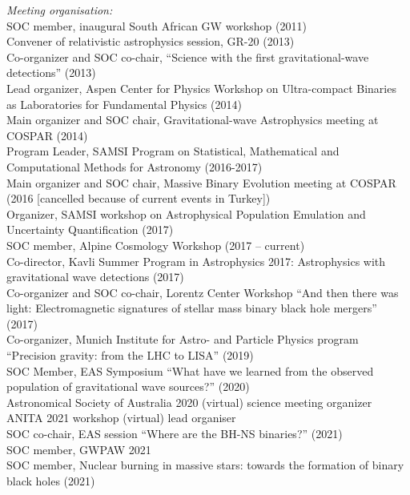 \documentclass[margin,line]{res}
\begin{document}
\begin{resume}
{\it Meeting organisation:}\\
SOC member, inaugural South African GW workshop (2011)\\
Convener of relativistic astrophysics session, GR-20 (2013)\\
Co-organizer and SOC co-chair, ``Science with the first gravitational-wave detections'' (2013)\\
Lead organizer, Aspen Center for Physics Workshop on Ultra-compact Binaries as Laboratories for Fundamental Physics (2014)\\
Main organizer and SOC chair, Gravitational-wave Astrophysics meeting at COSPAR (2014)\\
Program Leader, SAMSI Program on Statistical, Mathematical and Computational Methods for Astronomy (2016-2017)\\
Main organizer and SOC chair, Massive Binary Evolution meeting at COSPAR (2016 [cancelled because of current events in Turkey])\\
Organizer, SAMSI workshop on Astrophysical Population Emulation and Uncertainty Quantification (2017)\\
SOC member, Alpine Cosmology Workshop (2017 -- current)\\
Co-director, Kavli Summer Program in Astrophysics 2017: Astrophysics with gravitational wave detections (2017)\\
Co-organizer and SOC co-chair, Lorentz Center Workshop ``And then there was light:  Electromagnetic signatures of stellar mass binary black hole mergers'' (2017)\\
Co-organizer, Munich Institute for Astro- and Particle Physics program ``Precision gravity: from the LHC to LISA'' (2019)\\
SOC Member, EAS Symposium ``What have we learned from the observed population of gravitational wave sources?'' (2020)\\
Astronomical Society of Australia 2020 (virtual) science meeting organizer\\
ANITA 2021 workshop (virtual) lead organiser\\
SOC co-chair, EAS session ``Where are the BH-NS binaries?'' (2021)\\
SOC member, GWPAW 2021\\
SOC member, Nuclear burning in massive stars: towards the formation of binary black holes (2021)\\

\end{resume}
\end{document}
